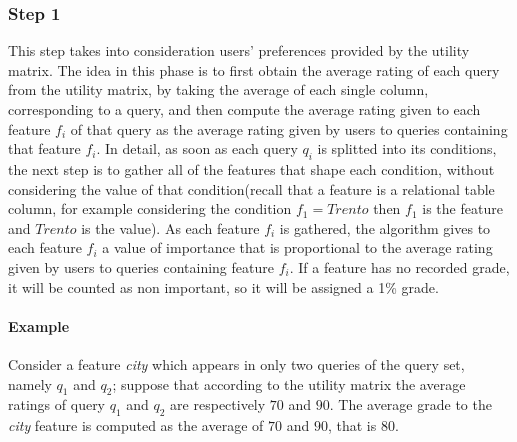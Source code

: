 \subsubsection{Step 1}

This step takes into consideration users' preferences provided by the utility matrix. The idea in this phase is to first obtain the average rating of each query from the utility matrix, by taking the average of each single column, corresponding to a query, and then compute the average rating given to each feature $f_i$ of that query as the average rating given by users to queries containing that feature $f_i$. In detail, as soon as each query $q_i$ is splitted into its conditions, the next step is to gather all of the features that shape each condition, without considering the value of that condition(recall that a feature is a relational table column, for example considering the condition $f_1 = Trento $ then $f_1$ is the feature and $Trento$ is the value). As each feature  $f_i$ is gathered, the algorithm gives to each feature $f_i$ a value of importance that is proportional to the average rating given by users to queries containing feature $f_i$. If a feature has no recorded grade, it will be counted as non important, so it will be assigned a 1\% grade. 

\paragraph{Example} Consider a feature \emph{city} which appears in only two queries of the query set, namely $q_1$ and $q_2$; suppose that according to the utility matrix the average ratings of query $q_1$ and $q_2$ are respectively $70$ and $90$. The average grade to the \emph{city} feature is computed as the average of $70$ and $90$, that is $80$.




